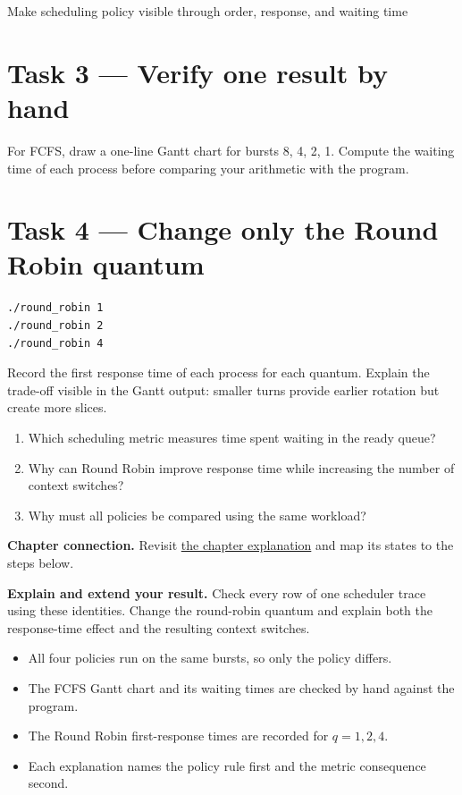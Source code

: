 \begin{labproject}{Make scheduling policy visible through order, response, and waiting time}
\section*{Task 3 --- Verify one result by hand}
For FCFS, draw a one-line Gantt chart for bursts 8, 4, 2, 1. Compute the waiting time of each process before comparing your arithmetic with the program.

\section*{Task 4 --- Change only the Round Robin quantum}
\begin{lstlisting}[style=utpbash]
./round_robin 1
./round_robin 2
./round_robin 4
\end{lstlisting}
Record the first response time of each process for each quantum. Explain the trade-off visible in the Gantt output: smaller turns provide earlier rotation but create more slices.

\begin{quickcheck}
\begin{enumerate}
  \item Which scheduling metric measures time spent waiting in the ready queue?
  \item Why can Round Robin improve response time while increasing the number of context switches?
  \item Why must all policies be compared using the same workload?
\end{enumerate}
\end{quickcheck}

\textbf{Chapter connection.} Revisit \hyperref[ch:scheduling]{the chapter explanation} and map its states to the steps below.


\begin{verification}
\textbf{Explain and extend your result.} Check every row of one scheduler trace using these identities. Change the round-robin quantum and explain both the response-time effect and the resulting context switches.


\begin{itemize}
  \item All four policies run on the same bursts, so only the policy differs.
  \item The FCFS Gantt chart and its waiting times are checked by hand against the program.
  \item The Round Robin first-response times are recorded for $q=1,2,4$.
  \item Each explanation names the policy rule first and the metric consequence second.
\end{itemize}
\end{verification}
\end{labproject}
